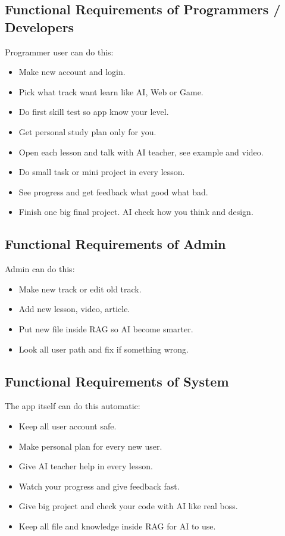 \documentclass{FastFyp}
\begin{document}
\subsection{Functional Requirements of Programmers / Developers}
Programmer user can do this:
\begin{itemize}
    \item Make new account and login.
    \item Pick what track want learn like AI, Web or Game.
    \item Do first skill test so app know your level.
    \item Get personal study plan only for you.
    \item Open each lesson and talk with AI teacher, see example and video.
    \item Do small task or mini project in every lesson.
    \item See progress and get feedback what good what bad.
    \item Finish one big final project. AI check how you think and design.
\end{itemize}

\subsection{Functional Requirements of Admin}
Admin can do this:
\begin{itemize}
    \item Make new track or edit old track.
    \item Add new lesson, video, article.
    \item Put new file inside RAG so AI become smarter.
    \item Look all user path and fix if something wrong.
\end{itemize}

\subsection{Functional Requirements of System}
The app itself can do this automatic:
\begin{itemize}
    \item Keep all user account safe.
    \item Make personal plan for every new user.
    \item Give AI teacher help in every lesson.
    \item Watch your progress and give feedback fast.
    \item Give big project and check your code with AI like real boss.
    \item Keep all file and knowledge inside RAG for AI to use.
\end{itemize}
\end{document}
